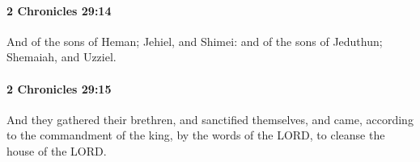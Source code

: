 		\paragraph{2 Chronicles 29:14} %
			\label{2CHRONICLES-29-14}

			And of the sons of Heman; Jehiel, and Shimei: and of the sons of Jeduthun; Shemaiah, and Uzziel.


		\paragraph{2 Chronicles 29:15} %
			\label{2CHRONICLES-29-15}

			And they gathered their brethren, and sanctified themselves, and came, according to the commandment of the king, by the words of the LORD, to cleanse the house of the LORD.


